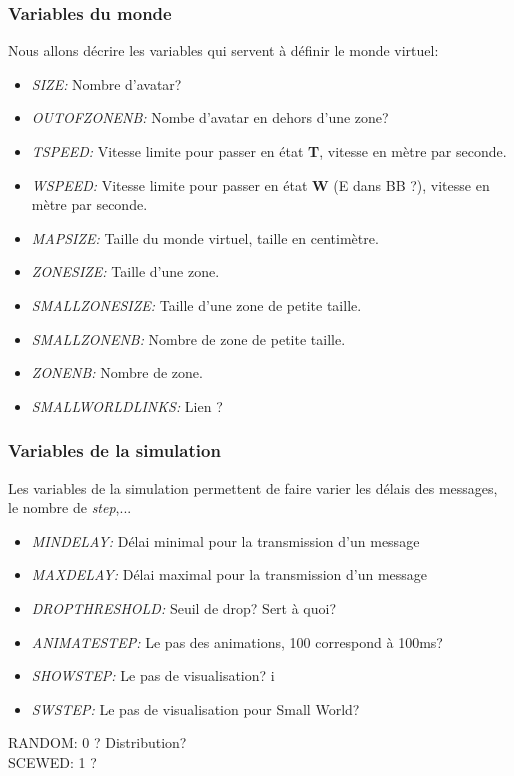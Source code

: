 \documentclass[11pt,a4paper]{article}
\begin{document}
\subsubsection{Variables du monde}
Nous allons décrire les variables qui servent à définir le monde virtuel:
\begin{itemize}
	\renewcommand{\labelitemi}{$\bullet$}
	\item \textit{SIZE:} Nombre d'avatar? 
	\item \textit{OUTOFZONENB:} Nombe d'avatar en dehors d'une zone?
	\item \textit{TSPEED:} Vitesse limite pour passer en état \textbf{T}, vitesse en mètre par seconde.
	\item \textit{WSPEED:} Vitesse limite pour passer en état \textbf{W} (E dans BB ?), vitesse en mètre par seconde.
	\item \textit{MAPSIZE:} Taille du monde virtuel, taille en centimètre.
	\item \textit{ZONESIZE:} Taille d'une zone.
	\item \textit{SMALLZONESIZE:} Taille d'une zone de petite taille.
	\item \textit{SMALLZONENB:} Nombre de zone de petite taille.
	\item \textit{ZONENB:} Nombre de zone.
	\item \textit{SMALLWORLDLINKS:} Lien ?
\end{itemize}

\subsubsection{Variables de la simulation}
Les variables de la simulation permettent de faire varier les délais des messages, le nombre de \textit{step},...
\begin{itemize}
	\renewcommand{\labelitemi}{$\bullet$} 
	\item \textit{MINDELAY:} Délai minimal pour la transmission d'un message
	\item \textit{MAXDELAY:} Délai maximal pour la transmission d'un message
	\item \textit{DROPTHRESHOLD:} Seuil de drop? Sert à quoi?
	\item \textit{ANIMATESTEP:} Le pas des animations, 100 correspond à 100ms? 
	\item \textit{SHOWSTEP:} Le pas de visualisation?
i	\item \textit{SWSTEP:} Le pas de visualisation pour Small World?
\end{itemize}
RANDOM: 0 ? Distribution?\\
SCEWED: 1 ?\\
\end{document}
